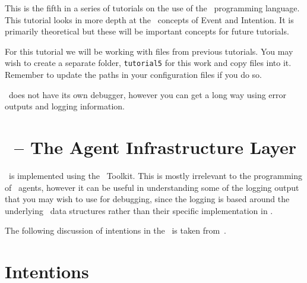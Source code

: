 
This is the fifth in a series of tutorials on the use of the \gwendolen\ programming language.  This tutorial looks in more depth at the \gwendolen\ concepts of Event and Intention.  It is primarily theoretical but these will be important concepts for future tutorials.

For this tutorial we will be working with files from previous tutorials.  You may wish to create a separate folder, \texttt{tutorial5} for this work and copy files into it.  Remember to update the paths in your configuration files if you do so.

\gwendolen\ does not have its own debugger, however you can get a long way using error outputs and logging information.

\section{\ail\ -- The Agent Infrastructure Layer}

\gwendolen\ is implemented using the \ail\ Toolkit.  This is mostly irrelevant to the programming of \gwendolen\ agents, however it can be useful in understanding some of the logging output that you may wish to use for debugging, since the logging is based around the underlying \java\ data structures rather than their specific implementation in \gwendolen.

The following discussion of intentions in the \ail\ is taken from~\cite{springerlink:10.1007/s10515-011-0088-x}.

\section{Intentions}

